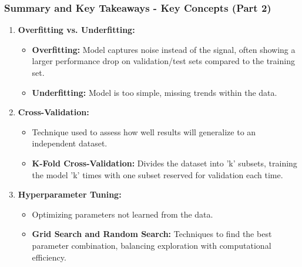 \documentclass[aspectratio=169]{beamer}
\begin{document}
\begin{frame}[fragile]
    \frametitle{Summary and Key Takeaways - Key Concepts (Part 2)}
    \begin{enumerate}[resume]
        \item \textbf{Overfitting vs. Underfitting:}
        \begin{itemize}
            \item \textbf{Overfitting:} Model captures noise instead of the signal, often showing a larger performance drop on validation/test sets compared to the training set.
            \item \textbf{Underfitting:} Model is too simple, missing trends within the data.
        \end{itemize}

        \item \textbf{Cross-Validation:}
        \begin{itemize}
            \item Technique used to assess how well results will generalize to an independent dataset.
            \item \textbf{K-Fold Cross-Validation:} Divides the dataset into 'k' subsets, training the model 'k' times with one subset reserved for validation each time.
        \end{itemize}

        \item \textbf{Hyperparameter Tuning:}
        \begin{itemize}
            \item Optimizing parameters not learned from the data.
            \item \textbf{Grid Search and Random Search:} Techniques to find the best parameter combination, balancing exploration with computational efficiency.
        \end{itemize}
    \end{enumerate}
\end{frame}
\end{document}
